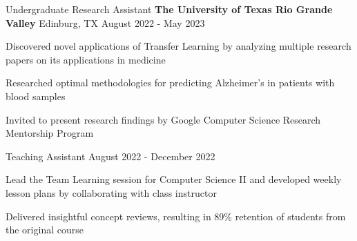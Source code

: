 \begin{cventries}

  \cventry
    {Undergraduate Research Assistant}
    {\textbf{The University of Texas Rio Grande Valley}}
    {Edinburg, TX}
    {August 2022 - May 2023}
    {
      \begin{cvitems}
        \item{Discovered novel applications of Transfer Learning by analyzing multiple research papers on its applications in medicine}
        \item{Researched optimal methodologies for predicting Alzheimer’s in patients with blood samples}
        \item{Invited to present research findings by Google Computer Science Research Mentorship Program}
      \end{cvitems}
    }

  \cventry
    {Teaching Assistant}
    {}
    {}
    {August 2022 - December 2022}
    {
      \begin{cvitems}
        \item{Lead the Team Learning session for Computer Science II and developed weekly lesson plans by collaborating with class instructor}
        \item{Delivered insightful concept reviews, resulting in 89\% retention of students from the original course}
      \end{cvitems}
    }

\end{cventries}
